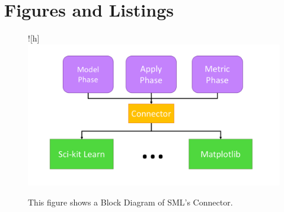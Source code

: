\clearpage

\section{Figures and Listings}



\begin{figure}![h]
\includegraphics[width=1\textwidth]{figures/SML/connector.png}
\centering
\caption{This figure shows a Block Diagram of SML's Connector.}
\label{fig:SML:Connector}
\end{figure}


